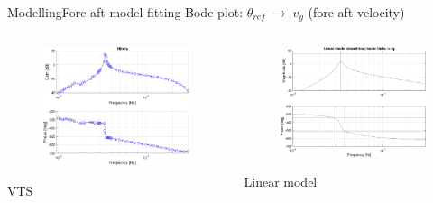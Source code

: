 \begin{frame}{Modelling}{Fore-aft model fitting}
	Bode plot: $ \theta_{ref} \; \rightarrow \; v_y $ (fore-aft velocity) 
	\begin{columns}
		\begin{column}{.49\textwidth}
			\begin{figure}[ht]
				\centering
				\includegraphics[width=1\linewidth]{../Graphics/TestResults/foreaftFitting/sysid_thSine-vy_16ms.png}
				\label{fig:sysid_wref-vy_16}
			\end{figure}
			\centering VTS
		\end{column}
	
		\begin{column}{.49\textwidth}
			\begin{figure}[ht]
				\centering
				\includegraphics[width=1\linewidth]{../Graphics/TestResults/foreaftFitting/wtLin_th-vy_16msV2.png}
				\label{fig:wtlin_wref-vy_16}
			\end{figure}
			\centering Linear model
		\end{column}
	\end{columns}
	
\end{frame}

